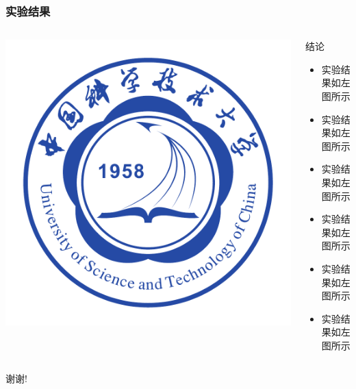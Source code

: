 \documentclass[12pt]{ctexbeamer}	%
\begin{document}
\begin{frame}
\frametitle{实验结果}
\begin{columns}
\begin{column}{0.50\textwidth}
\includegraphics[width=\textwidth]{ustc_logo_fig.pdf}
\end{column}
\begin{column}{0.50\textwidth}
\begin{block}{结论}
\begin{itemize}
\item 实验结果如左图所示
\item 实验结果如左图所示
\item 实验结果如左图所示
\item 实验结果如左图所示
\item 实验结果如左图所示
\item 实验结果如左图所示
\end{itemize}
\end{block}
\end{column}
\end{columns}
\end{frame}




\begin{frame}
\centerline{\Large 谢谢!}
\end{frame}
\end{document}
